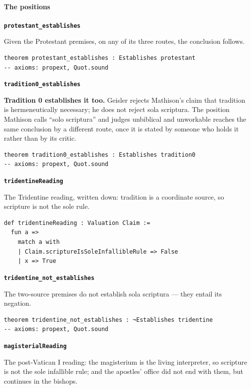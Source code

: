 \documentclass[11pt]{article}
\begin{document}
\paragraph*{The positions}
\leavevmode\par\nobreak
\par\medskip\noindent\textbf{\texttt{protestant\_\allowbreak{}establishes}}\par\nobreak\noindent
Given the Protestant premises, on any of its three routes, the conclusion follows.

{\small\begin{verbatim}
theorem protestant_establishes : Establishes protestant
-- axioms: propext, Quot.sound
\end{verbatim}}
\par\medskip\noindent\textbf{\texttt{tradition0\_\allowbreak{}establishes}}\par\nobreak\noindent
\textbf{Tradition 0 establishes it too.} Geisler rejects Mathison’s claim that tradition is hermeneutically necessary; he does not reject sola scriptura. The position Mathison calls “solo scriptura” and judges unbiblical and unworkable reaches the same conclusion by a different route, once it is stated by someone who holds it rather than by its critic.

{\small\begin{verbatim}
theorem tradition0_establishes : Establishes tradition0
-- axioms: propext, Quot.sound
\end{verbatim}}
\par\medskip\noindent\textbf{\texttt{tridentine\allowbreak{}Reading}}\par\nobreak\noindent
The Tridentine reading, written down: tradition is a coordinate source, so scripture is not the sole rule.

{\small\begin{verbatim}
def tridentineReading : Valuation Claim :=
  fun a =>
    match a with
    | Claim.scriptureIsSoleInfallibleRule => False
    | x => True
\end{verbatim}}
\par\medskip\noindent\textbf{\texttt{tridentine\_\allowbreak{}not\_\allowbreak{}establishes}}\par\nobreak\noindent
The two-source premises do not establish sola scriptura — they entail its negation.

{\small\begin{verbatim}
theorem tridentine_not_establishes : ¬Establishes tridentine
-- axioms: propext, Quot.sound
\end{verbatim}}
\par\medskip\noindent\textbf{\texttt{magisterial\allowbreak{}Reading}}\par\nobreak\noindent
The post-Vatican I reading: the magisterium is the living interpreter, so scripture is not the sole infallible rule; and the apostles’ office did not end with them, but continues in the bishops.
\end{document}
